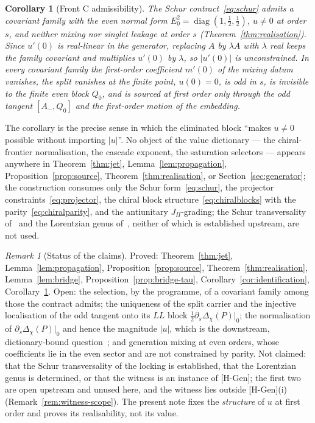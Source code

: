 \documentclass[11pt]{article}
\newtheorem{corollary}{Corollary}
\theoremstyle{definition}
\theoremstyle{remark}
\newtheorem{remark}{Remark}
\newcommand{\JPi}{J_{\Pi}}
\newcommand{\Dchi}{\Delta_{\chi}}
\newcommand{\diag}{\operatorname{diag}}
\begin{document}
    \begin{corollary}[Front C admissibility]
      \label{cor:frontc}
      The Schur contract~\eqref{eq:schur} admits a covariant family with the even normal form $E_0^2 = \diag(1,
      \tfrac12,
      \tfrac12)$, $u \neq 0$ at order $s$, and neither mixing nor singlet leakage at order $s$
      (Theorem~\ref{thm:realisation}).
      Since $u'(0)$ is real-linear in the generator, replacing $A$ by $\lambda A$ with $\lambda$ real keeps the family
      covariant and multiplies $u'(0)$ by $\lambda$, so $|u'(0)|$ is unconstrained.
      In every covariant family the first-order coefficient $m'(0)$ of the mixing datum vanishes, the split vanishes at
      the finite point,
      $u(0) = 0$, is odd in $s$, is invisible to the
      finite even block $Q_0$, and is sourced at first order only through the odd tangent $[A_-, Q_0]$ and the
      first-order motion of the embedding.
    \end{corollary}

    The corollary is the precise sense in which the eliminated block ``makes $u \neq 0$ possible without importing
    $|u|$''.
    No object of the value dictionary --- the chiral-frontier normalisation, the cascade exponent, the saturation
    selectors --- appears anywhere in Theorem~\ref{thm:jet}, Lemma~\ref{lem:propagation},
    Proposition~\ref{prop:source}, Theorem~\ref{thm:realisation}, or Section~\ref{sec:generator}; the construction
    consumes only the Schur form~\eqref{eq:schur}, the projector constraints~\eqref{eq:projector}, the chiral block
    structure~\eqref{eq:chiralblocks} with the parity~\eqref{eq:chiralparity}, and the antiunitary $\JPi$-grading; the
    Schur transversality of~\cite{Beau2026prs} and the Lorentzian genus of~\cite{Beau2026bim}, neither of which is
    established upstream, are not used.

    \begin{remark}[Status of the claims]
      \label{rem:status}
      Proved: Theorem~\ref{thm:jet}, Lemma~\ref{lem:propagation}, Proposition~\ref{prop:source},
      Theorem~\ref{thm:realisation}, Lemma~\ref{lem:bridge}, Proposition~\ref{prop:bridge-tau},
      Corollary~\ref{cor:identification}, Corollary~\ref{cor:frontc}.
      Open: the selection, by the programme, of a covariant family among those the contract admits; the uniqueness of
      the split carrier and the injective localisation of the odd tangent onto its $LL$ block
      $\tfrac12 \partial_s \Dchi(P)|_0$; the normalisation of
      $\partial_s \Dchi(P)|_0$ and hence the magnitude $|u|$, which is the downstream, dictionary-bound
      question~\cite{Beau2026fmnote}; and generation mixing at even orders, whose coefficients lie in the even sector
      and are not constrained by
      parity.
      Not claimed: that the Schur transversality of the locking is established, that the Lorentzian genus is determined,
      or that the witness is an instance of [H-Gen]; the first two are open upstream and unused here, and the witness
      lies outside [H-Gen](i) (Remark~\ref{rem:witness-scope}).
      The present note fixes the \emph{structure} of $u$ at first order and proves its realisability, not its value.
    \end{remark}
\end{document}
